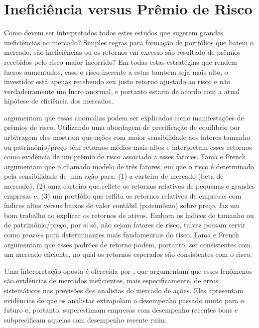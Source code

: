 \section{Ineficiência versus Prêmio de Risco}

Como devem ser interpretados todos estes estudos que sugerem grandes ineficiências no mercado? Simples regras para formação de portfólios que batem o mercado, são ineficiências ou os retornos em excesso são resultado de prêmios recebidos pelo risco maior incorrido? Em todas estas estratégias que rendem lucros aumentados, caso o risco inerente a estas também seja mais alto, o investidor está apenas recebendo seu justo retorno ajustado ao risco e não verdadeiramente um lucro anormal, e portanto estaria de acordo com a atual hipótese de eficiência dos mercados.

 argumentam que essas anomalias podem ser explicadas como manifestações de prêmios de risco. Utilizando uma abordagem de precificação de equilíbrio por arbitragem eles mostram que ações com maior sensibilidade aos fatores tamanho ou patrimônio/preço têm retornos médios mais altos e interpretam esses retornos como evidência de um prêmio de risco associado a esses fatores. Fama e French argumentam que o chamado modelo de três fatores, em que o risco é determinado pela sensibilidade de uma ação para: (1) a carteira de mercado (beta de mercado), (2) uma carteira que reflete os retornos relativos de pequenas e grandes empresas e, (3) um portfólio que reflita os retornos relativos de empresas com índices altos versus baixos de valor contábil (patrimônio) sobre preço, faz um bom trabalho ao explicar os retornos de ativos. Embora os índices de tamanho ou de patrimônio/preço, por si só, não sejam fatores de risco, talvez possam servir como \emph{proxies} para determinantes mais fundamentais do risco. Fama e French argumentam que esses padrões de retorno podem, portanto, ser consistentes com um mercado eficiente, no qual os retornos esperados são consistentes com o risco.

Uma interpretação oposta é oferecida por , que argumentam que esses fenômenos são evidências de mercados ineficientes, mais especificamente, de erros sistemáticos nas previsões dos analistas do mercado de ações. Eles apresentam evidências de que os analistas extrapolam o desempenho passado muito para o futuro e, portanto, superestimam empresas com desempenho recentes bons e subprecificam aquelas com desempenho recente ruim.
